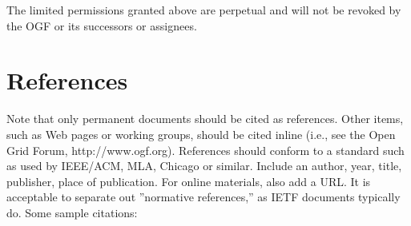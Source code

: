 \documentclass[10pt,a4paper]{article}
\begin{document}
The limited permissions granted above are perpetual and will not be
revoked by the OGF or its successors or assignees.

\section{References}

Note that only permanent documents should be cited as
references. Other items, such as Web pages or working groups, should
be cited inline (i.e., see the Open Grid Forum,
http://www.ogf.org). References should conform to a standard such as
used by IEEE/ACM, MLA, Chicago or similar. Include an author, year,
title, publisher, place of publication. For online materials, also add
a URL. It is acceptable to separate out ''normative references,'' as
IETF documents typically do. Some sample citations:
\end{document}
